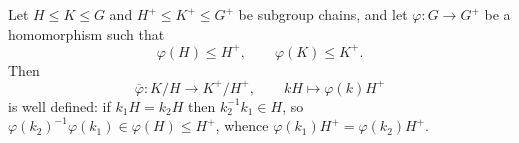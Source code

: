 \begin{definition}\label{def:coset-map}
Let
\( H\leq K\leq G \) and \( H^+\leq K^+\leq G^+ \) be subgroup chains, and
let \( \varphi\colon G\to G^+ \) be a homomorphism such that
\begin{equation}\label{eq:coset-map-hyp}
  \varphi(H)\leq H^+,
  \qquad
  \varphi(K)\leq K^+ .
\end{equation}
Then
\begin{equation}\label{eq:coset-map-def}
  \overline\varphi\colon K/H\longrightarrow K^+/H^+,
  \qquad
  kH\longmapsto \varphi(k)H^+
\end{equation}
is well defined: if \( k_1H=k_2H \) then \( k_2^{-1}k_1\in H \), so
\( \varphi(k_2)^{-1}\varphi(k_1)\in\varphi(H)\leq H^+ \), whence
\( \varphi(k_1)H^+=\varphi(k_2)H^+ \).
\end{definition}